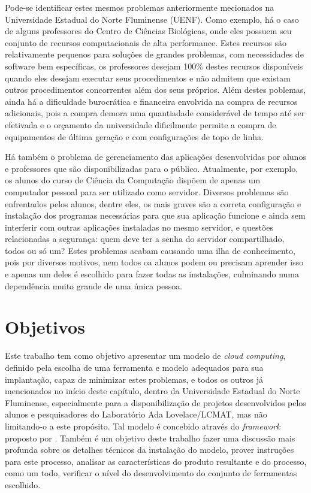 Pode-se identificar estes mesmos problemas anteriormente mecionados
na Universidade Estadual do Norte Fluminense (UENF). Como exemplo,
há o caso de alguns professores do Centro de Ciências Biológicas, onde eles
possuem seu conjunto de recursos computacionais de alta performance. Estes recursos são
relativamente pequenos para soluções de grandes problemas, com necessidades
de software bem específicas, os professores desejam 100\% destes recursos
disponíveis quando eles desejam executar seus procedimentos e não admitem
que existam outros procedimentos concorrentes além dos seus próprios. Além
destes poblemas, ainda há a dificuldade burocrática e financeira envolvida na
compra de recursos adicionais, pois a compra demora uma quantiadade considerável
de tempo até ser efetivada e o orçamento da universidade dificilmente permite a
compra de equipamentos de última geração e com configurações de topo de linha.

Há também o problema de gerenciamento das aplicações desenvolvidas por alunos e
professores que são disponibilizadas para o público. Atualmente, por exemplo,
os alunos do curso de Ciência da Computação dispõem de apenas um computador
pessoal para ser utilizado como servidor. Diversos problemas são enfrentados
pelos alunos, dentre eles, os mais graves são a correta configuração e
instalação dos programas necessárias para que sua aplicação funcione e ainda
sem interferir com outras aplicações instaladas no mesmo servidor, e questões
relacionadas a segurança: quem deve ter a senha do servidor compartilhado, todos ou só um?
Estes problemas acabam causando uma ilha de conhecimento, pois por diversos motivos,
nem todos oa alunos podem ou precisam aprender isso e apenas um deles é escolhido para fazer
todas as instalações, culminando numa dependência muito grande de uma única pessoa.

\section{Objetivos}

Este trabalho tem como objetivo apresentar um modelo de \emph{cloud computing},
definido pela escolha de uma ferramenta e modelo adequados para sua implantação,
capaz de minimizar estes problemas, e todos os outros já mencionados no início
deste capítulo, dentro da
Universidade Estadual do Norte Fluminense, especialmente para a disponibilização
de projetos desenvolvidos pelos alunos e pesquisadores do Laboratório Ada
Lovelace/LCMAT, mas não limitando-o a este propósito. Tal modelo é concebido
através do \emph{framework} proposto por .
Também é um objetivo deste trabalho fazer uma discussão mais profunda sobre os
detalhes técnicos da instalação do modelo, prover instruções para este processo,
analisar as características do produto resultante e do processo, como um todo,
verificar o nível do desenvolvimento do conjunto de ferramentas escolhido.


